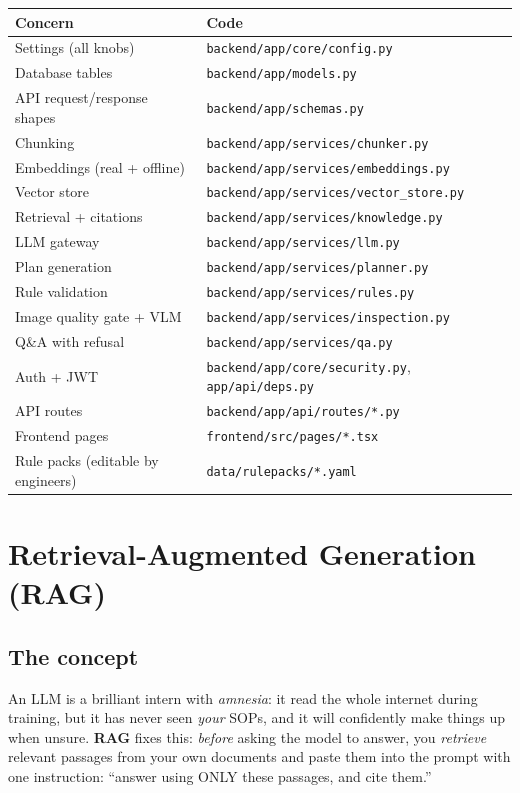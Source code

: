 \documentclass[11pt,a4paper]{article}
\newcommand{\codefile}[1]{\texttt{\small #1}}
\begin{document}
\begin{center}
\begin{tabular}{@{}ll@{}}
\toprule
\textbf{Concern} & \textbf{Code} \\
\midrule
Settings (all knobs) & \codefile{backend/app/core/config.py} \\
Database tables & \codefile{backend/app/models.py} \\
API request/response shapes & \codefile{backend/app/schemas.py} \\
Chunking & \codefile{backend/app/services/chunker.py} \\
Embeddings (real + offline) & \codefile{backend/app/services/embeddings.py} \\
Vector store & \codefile{backend/app/services/vector\_store.py} \\
Retrieval + citations & \codefile{backend/app/services/knowledge.py} \\
LLM gateway & \codefile{backend/app/services/llm.py} \\
Plan generation & \codefile{backend/app/services/planner.py} \\
Rule validation & \codefile{backend/app/services/rules.py} \\
Image quality gate + VLM & \codefile{backend/app/services/inspection.py} \\
Q\&A with refusal & \codefile{backend/app/services/qa.py} \\
Auth + JWT & \codefile{backend/app/core/security.py}, \codefile{app/api/deps.py} \\
API routes & \codefile{backend/app/api/routes/*.py} \\
Frontend pages & \codefile{frontend/src/pages/*.tsx} \\
Rule packs (editable by engineers) & \codefile{data/rulepacks/*.yaml} \\
\bottomrule
\end{tabular}
\end{center}

\section{Retrieval-Augmented Generation (RAG)}

\subsection{The concept}
An LLM is a brilliant intern with \emph{amnesia}: it read the whole internet during
training, but it has never seen \emph{your} SOPs, and it will confidently make things
up when unsure. \textbf{RAG} fixes this: \emph{before} asking the model to answer,
you \emph{retrieve} relevant passages from your own documents and paste them into the
prompt with one instruction: ``answer using ONLY these passages, and cite them.''
\end{document}
